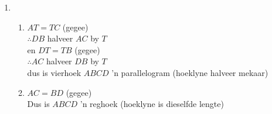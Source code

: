  \begin{solutions}{}{
\begin{enumerate}[itemsep=5pt, label=\textbf{\arabic*}. ] 


\item 
      \begin{enumerate}[noitemsep, label=\textbf{(\alph*)} ]
      \item 
$AT=TC$ (gegee)\\
$\therefore DB$ halveer $AC$ by $T$\\
en $DT=TB$ (gegee)\\
$\therefore AC$ halveer $DB$ by $T$\\
dus is vierhoek $ABCD$ 'n parallelogram (hoeklyne halveer mekaar)
      \item 
$AC=BD$ (gegee)\\
Dus is $ABCD$ 'n reghoek (hoeklyne is dieselfde lengte)
      \end{enumerate}

\end{enumerate}}
\end{solutions}


